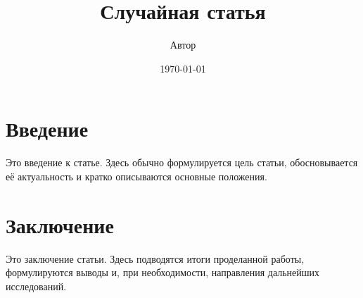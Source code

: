 \documentclass{article}
\title{Случайная статья}
\author{Автор}
\date{\today}
\begin{document}
\maketitle

\section{Введение}
Это введение к статье. Здесь обычно формулируется цель статьи, обосновывается её актуальность и кратко описываются основные положения.

\section{Заключение}
Это заключение статьи. Здесь подводятся итоги проделанной работы, формулируются выводы и, при необходимости, направления дальнейших исследований.
\end{document}
